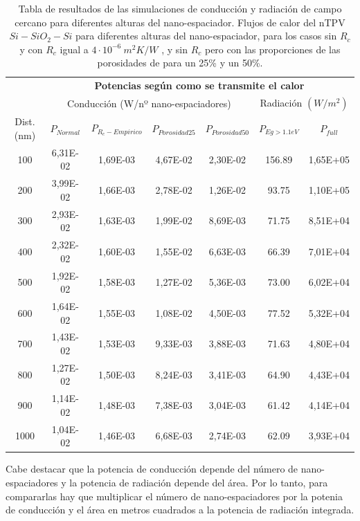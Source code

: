 \begin{table}[H]
	\centering
		\begin{tabular}{|c||c|c|c|c||c|c|}
		\hline
			\multirow{2}{*}{ }& \multicolumn{6}{c|}{\textbf{\large Potencias según como se transmite el calor}}\\ \cline{2-7}
		  & \multicolumn{4}{c||}{Conducción (W/nº nano-espaciadores)}& \multicolumn{2}{c|}{Radiación $(W/m^2)$}\\ \hline
			Dist. (nm)&$P_{Normal}$&$P_{R_c-Empirico}$&$P_{Porosidad25}$&$P_{Porosidad50}$&$P_{Eg>1.1eV}$&$P_{full}$\\ \hline \hline
			100&6,31E-02&1,69E-03&4,67E-02&2,30E-02&156.89&1,65E+05\\ \hline
			200&3,99E-02&1,66E-03&2,78E-02&1,26E-02&93.75&1,10E+05\\ \hline
			300&2,93E-02&1,63E-03&1,99E-02&8,69E-03&71.75&8,51E+04\\ \hline
			400&2,32E-02&1,60E-03&1,55E-02&6,63E-03&66.39&7,01E+04\\ \hline
			500&1,92E-02&1,58E-03&1,27E-02&5,36E-03&73.00&6,02E+04\\ \hline
			600&1,64E-02&1,55E-03&1,08E-02&4,50E-03&77.52&5,32E+04\\ \hline
			700&1,43E-02&1,53E-03&9,33E-03&3,88E-03&71.63&4,80E+04\\ \hline
			800&1,27E-02&1,50E-03&8,24E-03&3,41E-03&64.90&4,43E+04\\ \hline
			900&1,14E-02&1,48E-03&7,38E-03&3,04E-03&61.42&4,14E+04\\ \hline
		 1000&1,04E-02&1,46E-03&6,68E-03&2,74E-03&62.09&3,93E+04\\ \hline
		\end{tabular}
	\caption[Tabla de resultados de las simulaciones de conducción y radiación de campo cercano para diferentes alturas del nano-espaciador. Flujos de calor del nTPV $Si-SiO_2-Si$ para diferentes alturas del nano-espaciador, para los casos sin $R_c$ y con $R_c$ igual a $4 \cdot 10^{-6} \ m^2 K/W$, y sin $R_c$ pero con las proporciones de las porosidades de unos 25\% y un 50\%.]{Tabla de resultados de las simulaciones de conducción y radiación de campo cercano para diferentes alturas del nano-espaciador. Flujos de calor del nTPV $Si-SiO_2-Si$ para diferentes alturas del nano-espaciador, para los casos sin $R_c$ y con $R_c$ igual a $4 \cdot 10^{-6} \ m^2 K/W$ \cite{nf_TPV_Pillars_SiO2}, y sin $R_c$ pero con las proporciones de las porosidades de \cite{ThermalConductivity_SiO2_2018} para un 25\% y un 50\%.}
	\label{tab:condTerSiSiO2Si}
\end{table}
Cabe destacar que la potencia de conducción depende del número de nano-espaciadores y la potencia de radiación depende del área. Por lo tanto, para compararlas hay que multiplicar el número de nano-espaciadores por la potenia de conducción y el área en metros cuadrados a la potencia de radiación integrada.
\vfill \newpage
